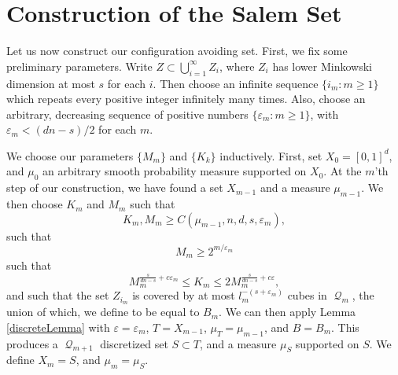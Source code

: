 \documentclass[12pt,reqno]{article}
\numberwithin{equation}{section}
\DeclareMathOperator{\DQ}{\mathcal{Q}}
\begin{document}
\section{Construction of the Salem Set}

Let us now construct our configuration avoiding set. First, we fix some preliminary parameters. Write $Z \subset \bigcup_{i = 1}^\infty Z_i$, where $Z_i$ has lower Minkowski dimension at most $s$ for each $i$. Then choose an infinite sequence $\{ i_m : m \geq 1 \}$ which repeats every positive integer infinitely many times. Also, choose an arbitrary, decreasing sequence of positive numbers $\{ \varepsilon_m : m \geq 1 \}$, with $\varepsilon_m < (dn - s)/2$ for each $m$.

We choose our parameters $\{ M_m \}$ and $\{ K_k \}$ inductively. First, set $X_0 = [0,1]^d$, and $\mu_0$ an arbitrary smooth probability measure supported on $X_0$. At the $m$'th step of our construction, we have found a set $X_{m-1}$ and a measure $\mu_{m-1}$. We then choose $K_m$ and $M_m$ such that
%
\[ K_m, M_m \geq C(\mu_{m-1}, n, d, s, \varepsilon_m), \]
%
such that
%
\begin{equation} \label{equation12901290}
    M_m \geq 2^{m/\varepsilon_m}
\end{equation}
%
such that
%
\[ M_m^{\frac{s}{dn-s} + c\varepsilon_m} \leq K_m \leq 2 M_m^{\frac{s}{dn-s} + c\varepsilon}, \]
%
and such that the set $Z_{i_m}$ is covered by at most $l_m^{-(s + \varepsilon_m)}$ cubes in $\DQ_m$, the union of which, we define to be equal to $B_m$. We can then apply Lemma \ref{discreteLemma} with $\varepsilon = \varepsilon_m$, $T = X_{m-1}$, $\mu_T = \mu_{m-1}$, and $B = B_m$. This produces a $\DQ_{m+1}$ discretized set $S \subset T$, and a measure $\mu_S$ supported on $S$. We define $X_m = S$, and $\mu_m = \mu_S$.
\end{document}

